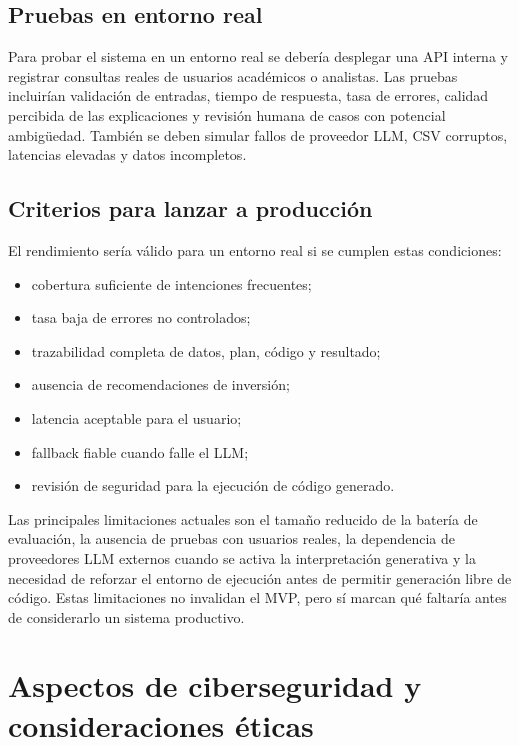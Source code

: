 \documentclass[11pt,a4paper]{article}
\let\oldsection\section
\renewcommand{\section}{\clearpage\oldsection}
\begin{document}
\subsection{Pruebas en entorno real}

Para probar el sistema en un entorno real se deber\'ia desplegar una API interna y registrar consultas reales de usuarios acad\'emicos o analistas. Las pruebas incluir\'ian validaci\'on de entradas, tiempo de respuesta, tasa de errores, calidad percibida de las explicaciones y revisi\'on humana de casos con potencial ambig\"uedad. Tambi\'en se deben simular fallos de proveedor LLM, CSV corruptos, latencias elevadas y datos incompletos.

\subsection{Criterios para lanzar a producci\'on}

El rendimiento ser\'ia v\'alido para un entorno real si se cumplen estas condiciones:

\begin{itemize}
    \item cobertura suficiente de intenciones frecuentes;
    \item tasa baja de errores no controlados;
    \item trazabilidad completa de datos, plan, c\'odigo y resultado;
    \item ausencia de recomendaciones de inversi\'on;
    \item latencia aceptable para el usuario;
    \item fallback fiable cuando falle el LLM;
    \item revisi\'on de seguridad para la ejecuci\'on de c\'odigo generado.
\end{itemize}

Las principales limitaciones actuales son el tama\~no reducido de la bater\'ia de evaluaci\'on, la ausencia de pruebas con usuarios reales, la dependencia de proveedores LLM externos cuando se activa la interpretaci\'on generativa y la necesidad de reforzar el entorno de ejecuci\'on antes de permitir generaci\'on libre de c\'odigo. Estas limitaciones no invalidan el MVP, pero s\'i marcan qu\'e faltar\'ia antes de considerarlo un sistema productivo.

\section{Aspectos de ciberseguridad y consideraciones \'eticas}
\end{document}
